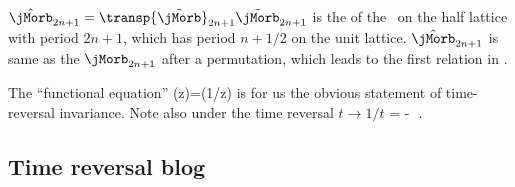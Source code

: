 $\hat{\jMorb}_{2n+1}=\transp{\tilde{\jMorb}}_{2n+1}\tilde{\jMorb}_{2n+1}$ is the
{\jacobianOrb} of the \templatt\ on the half lattice with period $2n+1$,
which has period $n+1/2$ on the unit lattice. $\hat{\jMorb}_{2n+1}$ is same as the
${\jMorb}_{2n+1}$ after a permutation, which leads to the first relation in
.

The ``functional equation'' %
\beq
\zeta(z)=\zeta(1/z)
is for us the obvious statement of time-reversal invariance.
Note also under the time reversal $t\to1/t$
\beq
{}  = -\,
\,.


\subsection{Time reversal blog}
\label{sect:reverseBlog}

